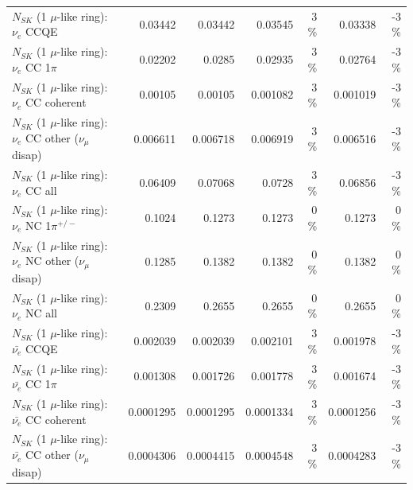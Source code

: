 \begin{table}
\begin{tabular}{| l | r | r | r  r | r  r |}
\hline
\hline
\hline
                                      $N_{SK}$ (1 $\mu$-like ring): $\nu_e$ CCQE &         0.03442 &         0.03442 &         0.03545 &        3 \%  &         0.03338 &       -3 \%  \\ 
                                 $N_{SK}$ (1 $\mu$-like ring): $\nu_e$ CC 1$\pi$ &         0.02202 &          0.0285 &         0.02935 &        3 \%  &         0.02764 &       -3 \%  \\ 
                               $N_{SK}$ (1 $\mu$-like ring): $\nu_e$ CC coherent &         0.00105 &         0.00105 &        0.001082 &        3 \%  &        0.001019 &       -3 \%  \\ 
                $N_{SK}$ (1 $\mu$-like ring): $\nu_e$ CC other ($\nu_\mu$ disap) &        0.006611 &        0.006718 &        0.006919 &        3 \%  &        0.006516 &       -3 \%  \\ 
                                  $N_{SK}$ (1 $\mu$-like ring): $\nu_{e}$ CC all &         0.06409 &         0.07068 &          0.0728 &        3 \%  &         0.06856 &       -3 \%  \\ 
\hline
                           $N_{SK}$ (1 $\mu$-like ring): $\nu_e$ NC 1$\pi^{+/-}$ &          0.1024 &          0.1273 &          0.1273 &        0 \%  &          0.1273 &        0 \%  \\ 
                $N_{SK}$ (1 $\mu$-like ring): $\nu_e$ NC other ($\nu_\mu$ disap) &          0.1285 &          0.1382 &          0.1382 &        0 \%  &          0.1382 &        0 \%  \\ 
                                  $N_{SK}$ (1 $\mu$-like ring): $\nu_{e}$ NC all &          0.2309 &          0.2655 &          0.2655 &        0 \%  &          0.2655 &        0 \%  \\ 
\hline
\hline
\hline
                                $N_{SK}$ (1 $\mu$-like ring): $\bar{\nu_e}$ CCQE &        0.002039 &        0.002039 &        0.002101 &        3 \%  &        0.001978 &       -3 \%  \\ 
                           $N_{SK}$ (1 $\mu$-like ring): $\bar{\nu_e}$ CC 1$\pi$ &        0.001308 &        0.001726 &        0.001778 &        3 \%  &        0.001674 &       -3 \%  \\ 
                         $N_{SK}$ (1 $\mu$-like ring): $\bar{\nu_e}$ CC coherent &       0.0001295 &       0.0001295 &       0.0001334 &        3 \%  &       0.0001256 &       -3 \%  \\ 
          $N_{SK}$ (1 $\mu$-like ring): $\bar{\nu_e}$ CC other ($\nu_\mu$ disap) &       0.0004306 &       0.0004415 &       0.0004548 &        3 \%  &       0.0004283 &       -3 \%  \\ 

\end{tabular}
\end{table}

